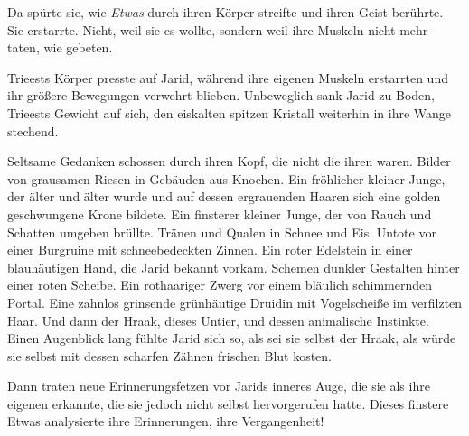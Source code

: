 Da spürte sie, wie \textit{Etwas} durch ihren Körper streifte und ihren Geist berührte. Sie erstarrte. Nicht, weil sie es wollte, sondern weil ihre Muskeln nicht mehr taten, wie gebeten.

Trieests Körper presste auf Jarid, während ihre eigenen Muskeln erstarrten und ihr größere Bewegungen verwehrt blieben. Unbeweglich sank Jarid zu Boden, Trieests Gewicht auf sich, den eiskalten spitzen Kristall weiterhin in ihre Wange stechend.

Seltsame Gedanken schossen durch ihren Kopf, die nicht die ihren waren. Bilder von grausamen Riesen in Gebäuden aus Knochen. Ein fröhlicher kleiner Junge, der älter und älter wurde und auf dessen ergrauenden Haaren sich eine golden geschwungene Krone bildete. Ein finsterer kleiner Junge, der von Rauch und Schatten umgeben brüllte. Tränen und Qualen in Schnee und Eis. Untote vor einer Burgruine mit schneebedeckten Zinnen. Ein roter Edelstein in einer blauhäutigen Hand, die Jarid bekannt vorkam. Schemen dunkler Gestalten hinter einer roten Scheibe. Ein rothaariger Zwerg vor einem bläulich schimmernden Portal. Eine zahnlos grinsende grünhäutige Druidin mit Vogelscheiße im verfilzten Haar. Und dann der Hraak, dieses Untier, und dessen animalische Instinkte. Einen Augenblick lang fühlte Jarid sich so, als sei sie selbst der Hraak, als würde sie selbst mit dessen scharfen Zähnen frischen Blut kosten.

Dann traten neue Erinnerungsfetzen vor Jarids inneres Auge, die sie als ihre eigenen erkannte, die sie jedoch nicht selbst hervorgerufen hatte. Dieses finstere Etwas analysierte ihre Erinnerungen, ihre Vergangenheit!

